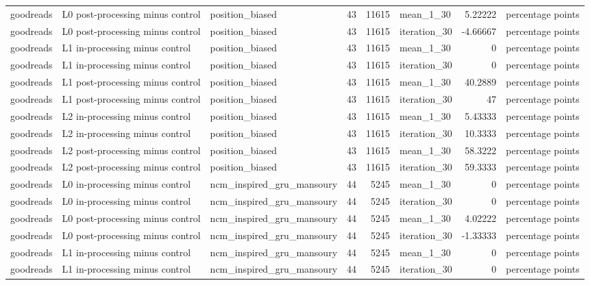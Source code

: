 \begin{table}[htbp!]
\begin{tabular}{lllrrlrl}
goodreads & L0 post-processing minus control & position\_biased & 43 & 11615 & mean\_1\_30 & 5.22222 & percentage points \\
goodreads & L0 post-processing minus control & position\_biased & 43 & 11615 & iteration\_30 & -4.66667 & percentage points \\
goodreads & L1 in-processing minus control & position\_biased & 43 & 11615 & mean\_1\_30 & 0 & percentage points \\
goodreads & L1 in-processing minus control & position\_biased & 43 & 11615 & iteration\_30 & 0 & percentage points \\
goodreads & L1 post-processing minus control & position\_biased & 43 & 11615 & mean\_1\_30 & 40.2889 & percentage points \\
goodreads & L1 post-processing minus control & position\_biased & 43 & 11615 & iteration\_30 & 47 & percentage points \\
goodreads & L2 in-processing minus control & position\_biased & 43 & 11615 & mean\_1\_30 & 5.43333 & percentage points \\
goodreads & L2 in-processing minus control & position\_biased & 43 & 11615 & iteration\_30 & 10.3333 & percentage points \\
goodreads & L2 post-processing minus control & position\_biased & 43 & 11615 & mean\_1\_30 & 58.3222 & percentage points \\
goodreads & L2 post-processing minus control & position\_biased & 43 & 11615 & iteration\_30 & 59.3333 & percentage points \\
goodreads & L0 in-processing minus control & ncm\_inspired\_gru\_mansoury & 44 & 5245 & mean\_1\_30 & 0 & percentage points \\
goodreads & L0 in-processing minus control & ncm\_inspired\_gru\_mansoury & 44 & 5245 & iteration\_30 & 0 & percentage points \\
goodreads & L0 post-processing minus control & ncm\_inspired\_gru\_mansoury & 44 & 5245 & mean\_1\_30 & 4.02222 & percentage points \\
goodreads & L0 post-processing minus control & ncm\_inspired\_gru\_mansoury & 44 & 5245 & iteration\_30 & -1.33333 & percentage points \\
goodreads & L1 in-processing minus control & ncm\_inspired\_gru\_mansoury & 44 & 5245 & mean\_1\_30 & 0 & percentage points \\
goodreads & L1 in-processing minus control & ncm\_inspired\_gru\_mansoury & 44 & 5245 & iteration\_30 & 0 & percentage points \\

\end{tabular}
\end{table}
